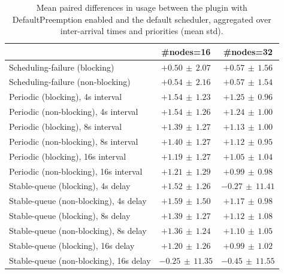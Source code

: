 \begin{table}[t]
\tiny
\setlength{\tabcolsep}{1.2pt}
\renewcommand{\arraystretch}{1.12}
\centering
\caption{Mean paired differences in usage between the plugin with DefaultPreemption enabled and the default scheduler, aggregated over inter-arrival times and priorities (mean \pm std).}
\label{tab:usage-defpreempt1-std1-agg-arrival-prio}
\begin{tabular}{l c c}
\toprule
 & \#nodes=16 & \#nodes=32 \\
\midrule
Scheduling-failure (blocking) & $+0.50\,\pm\,2.07$ & $+0.57\,\pm\,1.56$ \\
Scheduling-failure (non-blocking) & $+0.54\,\pm\,2.16$ & $+0.57\,\pm\,1.54$ \\
Periodic (blocking), 4s interval & $+1.54\,\pm\,1.23$ & $+1.25\,\pm\,0.96$ \\
Periodic (non-blocking), 4s interval & $+1.54\,\pm\,1.26$ & $+1.24\,\pm\,1.00$ \\
Periodic (blocking), 8s interval & $+1.39\,\pm\,1.27$ & $+1.13\,\pm\,1.00$ \\
Periodic (non-blocking), 8s interval & $+1.40\,\pm\,1.27$ & $+1.12\,\pm\,0.95$ \\
Periodic (blocking), 16s interval & $+1.19\,\pm\,1.27$ & $+1.05\,\pm\,1.04$ \\
Periodic (non-blocking), 16s interval & $+1.21\,\pm\,1.29$ & $+0.99\,\pm\,0.98$ \\
Stable-queue (blocking), 4s delay & $+1.52\,\pm\,1.26$ & $-0.27\,\pm\,11.41$ \\
Stable-queue (non-blocking), 4s delay & $+1.59\,\pm\,1.50$ & $+1.17\,\pm\,0.98$ \\
Stable-queue (blocking), 8s delay & $+1.39\,\pm\,1.27$ & $+1.12\,\pm\,1.08$ \\
Stable-queue (non-blocking), 8s delay & $+1.36\,\pm\,1.24$ & $+1.10\,\pm\,1.05$ \\
Stable-queue (blocking), 16s delay & $+1.20\,\pm\,1.26$ & $+0.99\,\pm\,1.02$ \\
Stable-queue (non-blocking), 16s delay & $-0.25\,\pm\,11.35$ & $-0.45\,\pm\,11.55$ \\
\bottomrule
\end{tabular}
\end{table}
